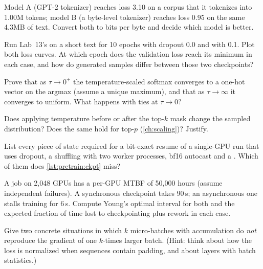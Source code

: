 \begin{exercise}
Model A (GPT-2 tokenizer) reaches loss 3.10 on a corpus that it tokenizes into 1.00M tokens;
model B (a byte-level tokenizer) reaches loss 0.95 on the same 4.3MB of text. Convert both to
bits per byte and decide which model is better.
\end{exercise}

\begin{exercise}
Run Lab~13's  on a short text for 10 epochs with dropout 0.0 and with 0.1.
Plot both loss curves. At which epoch does the validation loss reach its minimum in each case,
and how do generated samples differ between those two checkpoints?
\end{exercise}

\begin{exercise}
Prove that as $\tau\to0^+$ the temperature-scaled softmax converges to a one-hot vector on the
argmax (assume a unique maximum), and that as $\tau\to\infty$ it converges to uniform. What
happens with ties at $\tau\to0$?
\end{exercise}

\begin{exercise}
Does applying temperature before or after the top-$k$ mask change the sampled distribution?
Does the same hold for top-$p$ (\cref{ch:scaling})? Justify.
\end{exercise}

\begin{exercise}
List every piece of state required for a bit-exact resume of a single-GPU run that uses
dropout, a shuffling  with two worker processes, bf16 autocast and a
. Which of them does \cref{lst:pretrain:ckpt} miss?
\end{exercise}

\begin{exercise}
A job on 2{,}048 GPUs has a per-GPU MTBF of 50{,}000 hours (assume independent failures). A
synchronous checkpoint takes 90\,s; an asynchronous one stalls training for 6\,s. Compute
Young's optimal interval for both and the expected fraction of time lost to checkpointing plus
rework in each case.
\end{exercise}

\begin{exercise}
Give two concrete situations in which $k$ micro-batches with accumulation do \emph{not}
reproduce the gradient of one $k$-times larger batch. (Hint: think about how the loss is
normalized when sequences contain padding, and about layers with batch statistics.)
\end{exercise}

